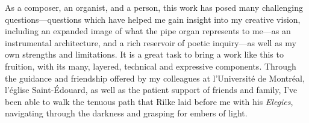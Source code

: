 \documentclass[12pt,twoside,maitrise]{dms_ks}
\theoremstyle{definition}
\begin{document}
{\newpage

As a composer, an organist, and a person, this work has posed many challenging questions---questions which have helped me gain insight into my creative vision, including an expanded image of what the pipe organ represents to me---as an instrumental architecture, and a rich reservoir of poetic inquiry---as well as my own strengths and limitations. 
It is a great task to bring a work like this to fruition, with its many, layered, technical and expressive components. 
Through the guidance and friendship offered by my colleagues at l'Université de Montréal, l'église Saint-Édouard, as well as the patient support of friends and family, I've been able to walk the tenuous path that Rilke laid before me with his \textit{Elegies}, navigating through the darkness and grasping for embers of light. 





\printbibliography

}
\end{document}
